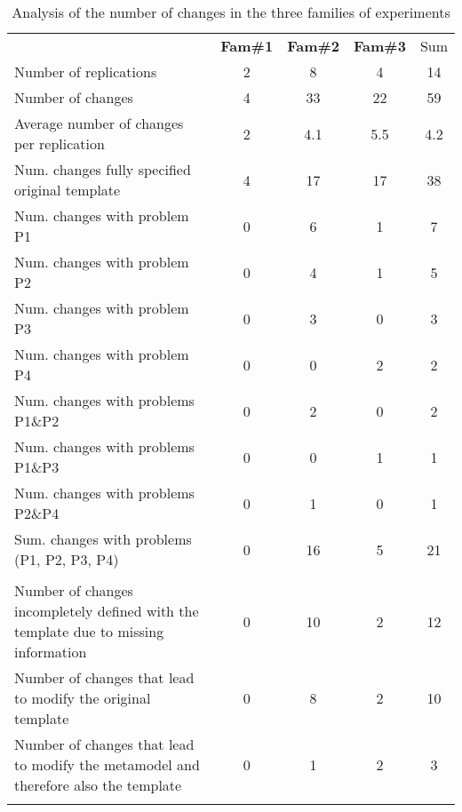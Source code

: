
\begin{table}[h]
  \caption{Analysis of the number of changes in the three families of experiments}
  \label{tab:agrupa}
  \centering
	\scriptsize
\begin{tabularx}{0.9\textwidth}{Xcccc}
  
	\hline\noalign{\smallskip}
		
    
    & \textbf{Fam\#1} & \textbf{Fam\#2} & \textbf{Fam\#3} & Sum \\

	\noalign{\smallskip}\hline\noalign{\smallskip}
	Number of replications & 2 & 8 & 4 & 14\\ 
	Number of changes  & 4 & 33 & 22 & 59\\ 
    Average number of changes per replication & 2 & 4.1 & 5.5 & 4.2\\ 
    Num. changes fully specified original template & 4 & 17 & 17 & 38\\ \hline
    Num. changes with problem P1 & 0 & 6 & 1 & 7\\ 
    Num. changes with problem P2 & 0 & 4 & 1 & 5\\ 
    Num. changes with problem P3 & 0 & 3 & 0 & 3 \\ 
    Num. changes with problem P4 & 0 & 0 & 2 & 2 \\
    Num. changes with problems P1\&P2  & 0 & 2 & 0 & 2 \\ 
    Num. changes with problems P1\&P3 & 0 & 0 & 1 & 1 \\ 
    Num. changes with problems P2\&P4 & 0 & 1 & 0 & 1 \\ \hline
    Sum. changes with problems (P1, P2, P3, P4) & 0 & 16 & 5 & 21 \\
    \hline
    \\ Number of changes incompletely defined with the template due to missing information & 0 & 10 & 2 & 12\\ 
    Number of changes that lead to modify the original template & 0 & 8 & 2 & 10\\ 
    Number of changes that lead to modify the metamodel and therefore also the template & 0 & 1 & 2 & 3\\ 
	\noalign{\smallskip\smallskip}\hline
	\end{tabularx}  
\end{table}
